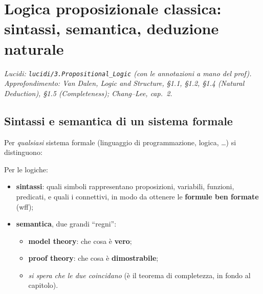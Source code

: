 \chapter{Logica proposizionale classica: sintassi, semantica, deduzione naturale}

\textit{Lucidi: \texttt{lucidi/3.Propositional\_Logic} (con le annotazioni a
mano del prof). Approfondimento: Van Dalen, \emph{Logic and Structure}, §1.1,
§1.2, §1.4 (Natural Deduction), §1.5 (Completeness); Chang--Lee, cap.~2.}


\section{Sintassi e semantica di un sistema formale}

Per \emph{qualsiasi} sistema formale (linguaggio di programmazione, logica,
\dots) si distinguono:


Per le logiche:
\begin{itemize}
  \item \textbf{sintassi}: quali simboli rappresentano proposizioni, variabili,
        funzioni, predicati, e quali i connettivi, in modo da ottenere le
        \textbf{formule ben formate} (wff);
  \item \textbf{semantica}, due grandi ``regni'':
    \begin{itemize}
      \item \textbf{model theory}: che cosa è \textbf{vero};
      \item \textbf{proof theory}: che cosa è \textbf{dimostrabile};
      \item \emph{si spera che le due coincidano} (è il teorema di completezza,
            in fondo al capitolo).
    \end{itemize}
\end{itemize}


